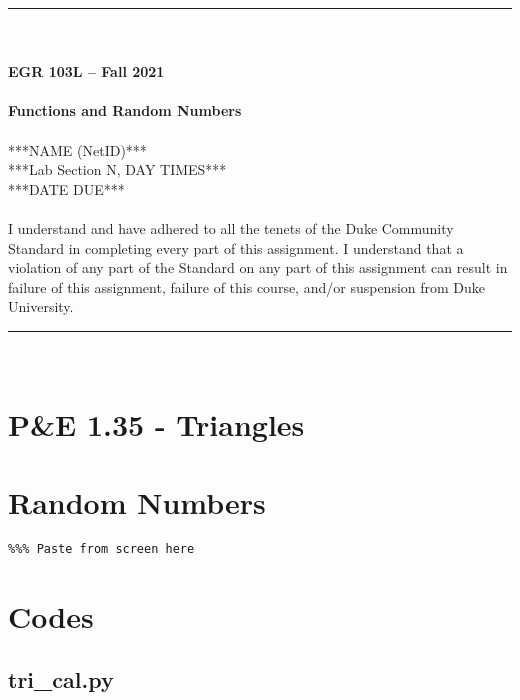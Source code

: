 \documentclass{article}
\begin{document}
\begin{center}
\rule{6.5in}{0.5mm}\\~\\
\textbf{\large EGR 103L -- Fall 2021}\\~\\
\textbf{\huge Functions and Random Numbers}\\~\\
***NAME (NetID)***\\
***Lab Section N, DAY TIMES***\\
***DATE DUE***\\~\\
{\small I understand and have adhered to all the tenets of the Duke Community Standard in completing every part of this assignment.  I understand that a violation of any part of the Standard on any part of this assignment can result in failure of this assignment, failure of this course, and/or suspension from Duke University.} 
\rule{6.5in}{0.5mm}\\
\end{center}
\tableofcontents
\listoffigures
\pagebreak

\section{P\&E 1.35 - Triangles}

\section{Random Numbers}
\begin{lstlisting}
%%% Paste from screen here
\end{lstlisting}

\pagebreak
\appendix
\section{Codes}
\lstset{style=python103, language=python} 





\subsection{tri\_cal.py}
\clearpage
\end{document}
